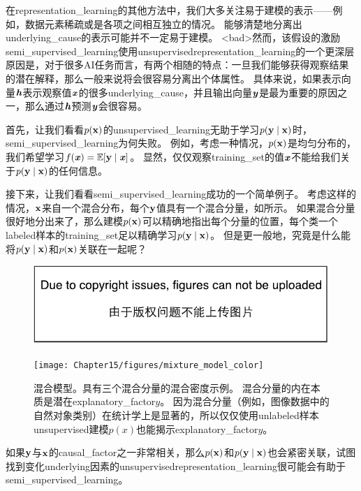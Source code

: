 在\gls{representation_learning}的其他方法中，我们大多关注易于建模的表示——例如，数据元素稀疏或是各项之间相互独立的情况。
能够清楚地分离出\gls{underlying_cause}的表示可能并不一定易于建模。%
<bad>然而，该假设的激励\gls{semi_supervised_learning}使用\gls{unsupervised}\gls{representation_learning}的一个更深层原因是，对于很多\gls{AI}任务而言，有两个相随的特点：一旦我们能够获得观察结果的潜在解释，那么一般来说将会很容易分离出个体属性。
具体来说，如果表示向量$\boldsymbol{\mathit{h}}$表示观察值$\boldsymbol{\mathit{x}}$的很多\gls{underlying_cause}，并且输出向量$\boldsymbol{\mathit{y}}$是最为重要的原因之一，那么通过$\boldsymbol{\mathit{h}}$预测$\boldsymbol{\mathit{y}}$会很容易。

首先，让我们看看$p(\mathbf{x})$的\gls{unsupervised_learning}无助于学习$p(\mathbf{y}\mid\mathbf{x})$时，\gls{semi_supervised_learning}为何失败。
例如，考虑一种情况，$p(\mathbf{x})$是均匀分布的，我们希望学习$f(\boldsymbol{\mathit{x}}) = \mathbb{E}[\mathbf{y} \mid \boldsymbol{\mathit{x}}]$。
显然，仅仅观察\gls{training_set}的值$\boldsymbol{\mathit{x}}$不能给我们关于$p(\mathbf{y} \mid \mathbf{x})$的任何信息。

接下来，让我们看看\gls{semi_supervised_learning}成功的一个简单例子。
考虑这样的情况，$\mathbf{x}$来自一个混合分布，每个$\mathbf{y}$值具有一个混合分量，如所示。
如果混合分量很好地分出来了，那么建模$p(\mathbf{x})$可以精确地指出每个分量的位置，每个类一个\gls{labeled}样本的\gls{training_set}足以精确学习$p(\mathbf{y} \mid \mathbf{x})$。
但是更一般地，究竟是什么能将$p(\mathbf{y} \mid \mathbf{x})$和$p(\mathbf{x})$关联在一起呢？


\begin{figure}[!htb]
\ifOpenSource
\centerline{\includegraphics{figure.pdf}}
\else
\centerline{\texttt{[image: Chapter15/figures/mixture\_model\_color]}}
\fi
\caption{混合模型。具有三个混合分量的混合密度示例。
混合分量的内在本质是潜在\gls{explanatory_factor}$y$。
因为混合分量（例如，图像数据中的自然对象类别）在统计学上是显著的，所以仅仅使用\gls{unlabeled}样本\gls{unsupervised}建模$p(x)$也能揭示\gls{explanatory_factor}$y$。
}
\label{fig:chap15_mixture_model}
\end{figure}


如果$\mathbf{y}$与$\mathbf{x}$的\gls{causal_factor}之一非常相关，那么$p(\mathbf{x})$和$p(\mathbf{y} \mid \mathbf{x})$也会紧密关联，试图找到变化\gls{underlying}因素的\gls{unsupervised}\gls{representation_learning}很可能会有助于\gls{semi_supervised_learning}。


